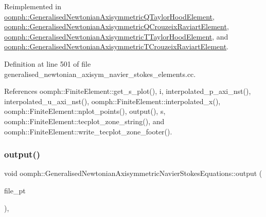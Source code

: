 Reimplemented in \hyperlink{classoomph_1_1GeneralisedNewtonianAxisymmetricQTaylorHoodElement_a523d450f7d50883425f33c9858ae6452}{oomph\+::\+Generalised\+Newtonian\+Axisymmetric\+Q\+Taylor\+Hood\+Element}, \hyperlink{classoomph_1_1GeneralisedNewtonianAxisymmetricQCrouzeixRaviartElement_a9bf8fddef7384ba0a8966502a137584b}{oomph\+::\+Generalised\+Newtonian\+Axisymmetric\+Q\+Crouzeix\+Raviart\+Element}, \hyperlink{classoomph_1_1GeneralisedNewtonianAxisymmetricTTaylorHoodElement_a9dbf98876164e1a9443a01fb3b0d284b}{oomph\+::\+Generalised\+Newtonian\+Axisymmetric\+T\+Taylor\+Hood\+Element}, and \hyperlink{classoomph_1_1GeneralisedNewtonianAxisymmetricTCrouzeixRaviartElement_a645fbf96a334ee860b036dfd24858651}{oomph\+::\+Generalised\+Newtonian\+Axisymmetric\+T\+Crouzeix\+Raviart\+Element}.



Definition at line 501 of file generalised\+\_\+newtonian\+\_\+axisym\+\_\+navier\+\_\+stokes\+\_\+elements.\+cc.



References oomph\+::\+Finite\+Element\+::get\+\_\+s\+\_\+plot(), i, interpolated\+\_\+p\+\_\+axi\+\_\+nst(), interpolated\+\_\+u\+\_\+axi\+\_\+nst(), oomph\+::\+Finite\+Element\+::interpolated\+\_\+x(), oomph\+::\+Finite\+Element\+::nplot\+\_\+points(), output(), s, oomph\+::\+Finite\+Element\+::tecplot\+\_\+zone\+\_\+string(), and oomph\+::\+Finite\+Element\+::write\+\_\+tecplot\+\_\+zone\+\_\+footer().

\mbox{\label{classoomph_1_1GeneralisedNewtonianAxisymmetricNavierStokesEquations_a34a51e3ad73df1ddca173e59a1404c90}} 
\subsubsection{\texorpdfstring{output()}{output()}\hspace{0.1cm}{\footnotesize\ttfamily [3/4]}}
{\footnotesize\ttfamily void oomph\+::\+Generalised\+Newtonian\+Axisymmetric\+Navier\+Stokes\+Equations\+::output (\begin{DoxyParamCaption}\item[{F\+I\+LE $\ast$}]{file\+\_\+pt }\end{DoxyParamCaption})\hspace{0.3cm}{\ttfamily [inline]}, {\ttfamily [virtual]}}



